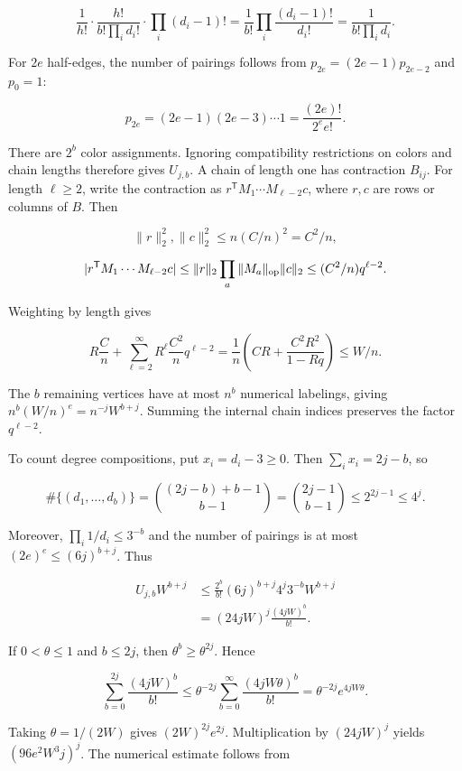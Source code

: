 \documentclass[11pt,a4paper]{article}
\begin{document}
\[
\frac1{h!}\cdot\frac{h!}{b!\prod_i d_i!}\cdot\prod_i(d_i-1)!
=\frac1{b!}\prod_i\frac{(d_i-1)!}{d_i!}
=\frac1{b!\prod_i d_i}.
\]

For \(2e\) half-edges, the number of pairings follows from \(p_{2e}=(2e-1)p_{2e-2}\) and \(p_0=1\):

\[
p_{2e}=(2e-1)(2e-3)\cdots1=\frac{(2e)!}{2^ee!}.
\]

There are \(2^b\) color assignments. Ignoring compatibility restrictions on colors and chain lengths therefore gives \(U_{j,b}\). A chain of length one has contraction \(B_{ij}\). For length \(\ell\ge2\), write the contraction as \(r^{\mathsf T}M_1\cdots M_{\ell-2}c\), where \(r,c\) are rows or columns of \(B\). Then

\[
\|r\|_2^2,\|c\|_2^2\le n(C/n)^2=C^2/n,
\]

\[
|r^{\mathsf T}M_1\cdots M_{\ell-2}c|
\le\|r\|_2\prod_a\|M_a\|_{\rm op}\|c\|_2
\le(C^2/n)q^{\ell-2}.
\]

Weighting by length gives

\[
R\frac Cn+\sum_{\ell=2}^{\infty}R^\ell\frac{C^2}nq^{\ell-2}
=\frac1n\left(CR+\frac{C^2R^2}{1-Rq}\right)\le W/n.
\]

The \(b\) remaining vertices have at most \(n^b\) numerical labelings, giving \(n^b(W/n)^e=n^{-j}W^{b+j}\). Summing the internal chain indices preserves the factor \(q^{\ell-2}\).

To count degree compositions, put \(x_i=d_i-3\ge0\). Then \(\sum_ix_i=2j-b\), so

\[
\#\{(d_1,\ldots,d_b)\}=\binom{(2j-b)+b-1}{b-1}
=\binom{2j-1}{b-1}\le2^{2j-1}\le4^j.
\]

Moreover, \(\prod_i1/d_i\le3^{-b}\) and the number of pairings is at most \((2e)^e\le(6j)^{b+j}\). Thus

\[
\begin{aligned}
U_{j,b}W^{b+j}
&\le\frac{2^b}{b!}(6j)^{b+j}4^j3^{-b}W^{b+j}\\
&=(24jW)^j\frac{(4jW)^b}{b!}.
\end{aligned}
\]

If \(0<\theta\le1\) and \(b\le2j\), then \(\theta^b\ge\theta^{2j}\). Hence

\[
\sum_{b=0}^{2j}\frac{(4jW)^b}{b!}
\le\theta^{-2j}\sum_{b=0}^{\infty}\frac{(4jW\theta)^b}{b!}
=\theta^{-2j}e^{4jW\theta}.
\]

Taking \(\theta=1/(2W)\) gives \((2W)^{2j}e^{2j}\). Multiplication by \((24jW)^j\) yields \((96e^2W^3j)^j\). The numerical estimate follows from
\end{document}
